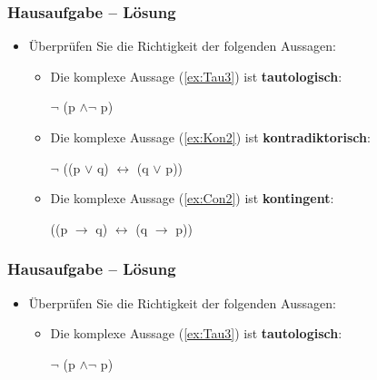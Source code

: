 {
\begin{frame}
\frametitle{Hausaufgabe -- Lösung}

\begin{itemize}
\item Überprüfen Sie die Richtigkeit der folgenden Aussagen:

\vspace{1em}

\begin{itemize}
\item Die komplexe Aussage (\ref{ex:Tau3}) ist \textbf{tautologisch}:

\eal
\ex\label{ex:Tau3} $\lnot$ (p $\land \lnot$ p)
\zl

\item Die komplexe Aussage (\ref{ex:Kon2}) ist \textbf{kontradiktorisch}:

\eal
\ex\label{ex:Kon2} $\lnot$ ((p $\lor$ q) $\leftrightarrow$ (q $\lor$ p))
\zl

\item Die komplexe Aussage (\ref{ex:Con2}) ist \textbf{kontingent}:

\eal
\ex\label{ex:Con2} ((p $\rightarrow$ q) $\leftrightarrow$ (q $\rightarrow$ p))
\zl

\end{itemize}	

\end{itemize}

\end{frame}


\begin{frame}
\frametitle{Hausaufgabe -- Lösung}

\begin{itemize}
\item Überprüfen Sie die Richtigkeit der folgenden Aussagen:

\vspace{1em}

\begin{itemize}
\item Die komplexe Aussage (\ref{ex:Tau3}) ist \textbf{tautologisch}:

\begin{exe}
 $\lnot$ (p $\land \lnot$ p)
\end{exe}
\end{itemize}	

\end{itemize}


\end{frame}}
